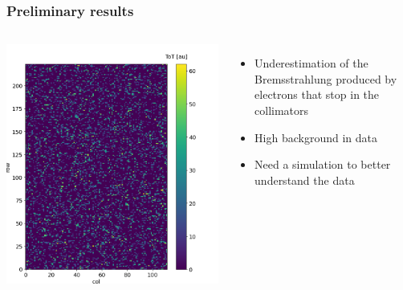    \begin{frame}
        \frametitle{Preliminary results}
        \begin{columns}
                \includegraphics[width=1.1\linewidth]{figures/test_beam/tot_mapq1_15-57.png}  
                \begin{itemize}
                    \item Underestimation of the Bremsstrahlung produced by electrons that stop in the collimators 
                    \item High background in data
                    \item Need a simulation to better understand the data
                \end{itemize}
            \end{columns}
        \end{frame}  


